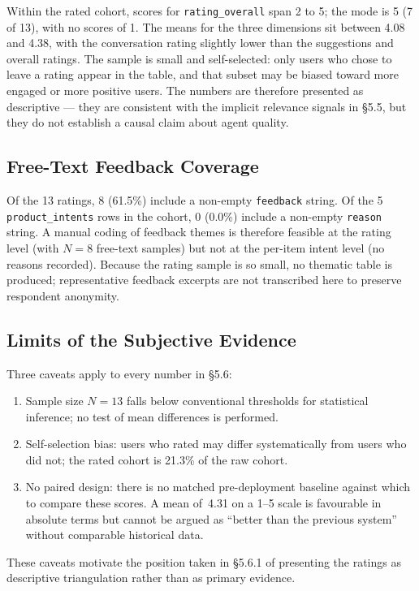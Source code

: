 Within the rated cohort, scores for \texttt{rating\_overall} span 2 to 5; the mode is 5 (7 of 13), with no scores of 1. The means for the three dimensions sit between 4.08 and 4.38, with the conversation rating slightly lower than the suggestions and overall ratings. The sample is small and self-selected: only users who chose to leave a rating appear in the table, and that subset may be biased toward more engaged or more positive users. The numbers are therefore presented as descriptive --- they are consistent with the implicit relevance signals in §5.5, but they do not establish a causal claim about agent quality.

\subsection{Free-Text Feedback Coverage}
\label{subsec:feedback_coverage}

Of the 13 ratings, 8 (61.5\%) include a non-empty \texttt{feedback} string. Of the 5 \texttt{product\_intents} rows in the cohort, 0 (0.0\%) include a non-empty \texttt{reason} string. A manual coding of feedback themes is therefore feasible at the rating level (with $N=8$ free-text samples) but not at the per-item intent level (no reasons recorded). Because the rating sample is so small, no thematic table is produced; representative feedback excerpts are not transcribed here to preserve respondent anonymity.

\subsection{Limits of the Subjective Evidence}
\label{subsec:subjective_limits}

Three caveats apply to every number in §5.6:

\begin{enumerate}
    \item Sample size $N=13$ falls below conventional thresholds for statistical inference; no test of mean differences is performed.
    \item Self-selection bias: users who rated may differ systematically from users who did not; the rated cohort is 21.3\% of the raw cohort.
    \item No paired design: there is no matched pre-deployment baseline against which to compare these scores. A mean of~4.31 on a 1--5 scale is favourable in absolute terms but cannot be argued as ``better than the previous system'' without comparable historical data.
\end{enumerate}

These caveats motivate the position taken in §5.6.1 of presenting the ratings as descriptive triangulation rather than as primary evidence.
